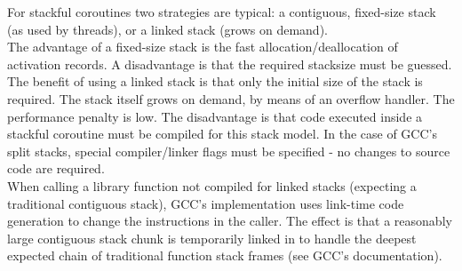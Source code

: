 For stackful coroutines two strategies are typical: a contiguous, fixed-size
stack (as used by threads), or a linked stack (grows on demand).\\
The advantage of a fixed-size stack is the fast allocation/deallocation of
activation records. A disadvantage is that the required stacksize must
be guessed.\\
The benefit of using a linked stack is that only the initial size of the stack
is required. The stack itself grows on demand, by means of an overflow
handler. The performance penalty is low. The disadvantage is that code
executed inside a stackful coroutine must be compiled for this stack model. In
the case of GCC's split stacks, special compiler/linker flags must be
specified - no changes to source code are required.\\
When calling a library function not compiled for linked stacks (expecting a
traditional contiguous stack), GCC's implementation uses link-time code
generation to change the instructions in the caller. The effect is that a
reasonably large contiguous stack chunk is temporarily linked in to handle the
deepest expected chain of traditional function stack frames (see GCC's
documentation\cite{gccsplit}).
